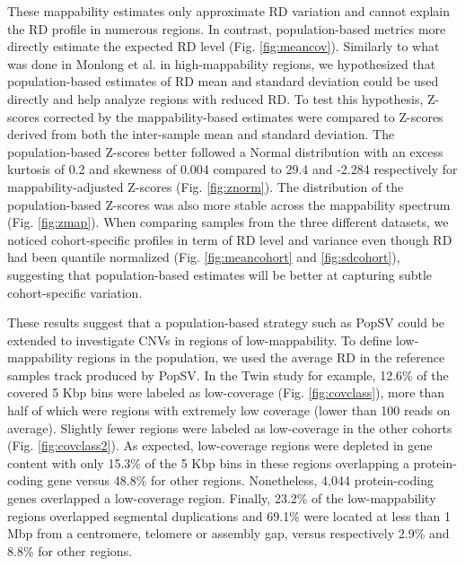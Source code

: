 These mappability estimates only approximate RD variation and cannot explain the RD profile in numerous regions.
In contrast, population-based metrics more directly estimate the expected RD level (Fig. \ref{fig:meancov}).
Similarly to what was done in Monlong et al. in high-mappability regions\cite{Monlong2018}, we hypothesized that population-based estimates of RD mean and standard deviation could be used directly and help analyze regions with reduced RD.
To test this hypothesis, Z-scores corrected by the mappability-based estimates were compared to Z-scores derived from both the inter-sample mean and standard deviation.
The population-based Z-scores better followed a Normal distribution with an excess kurtosis of 0.2 and skewness of 0.004 compared to 29.4 and -2.284 respectively for mappability-adjusted Z-scores (Fig. \ref{fig:znorm}).
The distribution of the population-based Z-scores was also more stable across the mappability spectrum (Fig. \ref{fig:zmap}).
When comparing samples from the three different datasets, we noticed cohort-specific profiles in term of RD level and variance even though RD had been quantile normalized (Fig. \ref{fig:meancohort} and \ref{fig:sdcohort}), suggesting that population-based estimates will be better at capturing subtle cohort-specific variation.


These results suggest that a population-based strategy such as {\sf PopSV}\cite{Monlong2018} could be extended to investigate CNVs in regions of low-mappability.
To define low-mappability regions in the population, we used the average RD in the reference samples track produced by {\sf PopSV}.
In the Twin study for example, 12.6\% of the covered 5 Kbp bins were labeled as low-coverage (Fig. \ref{fig:covclass}), more than half of which were regions with extremely low coverage (lower than 100 reads on average).
Slightly fewer regions were labeled as low-coverage in the other cohorts (Fig. \ref{fig:covclass2}). As expected, low-coverage regions were depleted in gene content with only 15.3\% of the 5 Kbp bins in these regions overlapping a protein-coding gene versus 48.8\% for other regions. Nonetheless, 4,044 protein-coding genes overlapped a low-coverage region.
Finally, 23.2\% of the low-mappability regions overlapped segmental duplications and 69.1\% were located at less than 1 Mbp from a centromere, telomere or assembly gap, versus respectively 2.9\% and 8.8\% for other regions.

